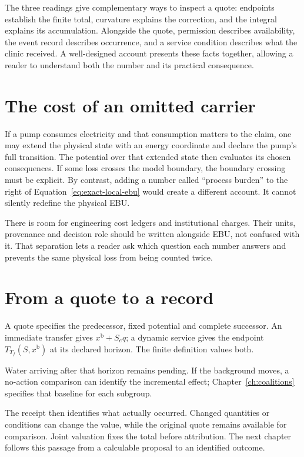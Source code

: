 The three readings give complementary ways to inspect a quote: endpoints establish the finite total, curvature explains the correction, and the integral explains its accumulation. Alongside the quote, permission describes availability, the event record describes occurrence, and a service condition describes what the clinic received. A well-designed account presents these facts together, allowing a reader to understand both the number and its practical consequence.

\section{The cost of an omitted carrier}
If a pump consumes electricity and that consumption matters to the claim,
one may extend the physical state with an energy coordinate and declare the
pump's full transition. The potential over that extended state then evaluates
its chosen consequences. If some loss crosses the model boundary, the
boundary crossing must be explicit. By contrast, adding a number called
``process burden'' to the right of Equation~\ref{eq:exact-local-ebu} would
create a different account. It cannot silently redefine the physical EBU.

There is room for engineering cost ledgers and institutional charges. Their
units, provenance and decision role should be written alongside EBU, not
confused with it. That separation lets a reader ask which question each
number answers and prevents the same physical loss from being counted twice.

\section{From a quote to a record}
A quote specifies the predecessor, fixed potential and complete successor. An immediate transfer gives $x^{\mathrm b}+S_eq$; a dynamic service gives the endpoint $T_{T_f}(S,x^{\mathrm b})$ at its declared horizon. The finite definition values both.

Water arriving after that horizon remains pending. If the background moves, a no-action comparison can identify the incremental effect; Chapter~\ref{ch:coalitions} specifies that baseline for each subgroup.

The receipt then identifies what actually occurred. Changed quantities or conditions can change the value, while the original quote remains available for comparison. Joint valuation fixes the total before attribution. The next chapter follows this passage from a calculable proposal to an identified outcome.
